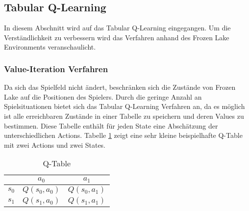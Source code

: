 \documentclass[11pt]{scrartcl}
\begin{document}
\subsection{Tabular Q-Learning}
In diesem Abschnitt wird auf das Tabular Q-Learning eingegangen. Um die
Ver\-ständ\-lich\-keit zu verbessern wird das Verfahren anhand des Frozen Lake
Environments veranschaulicht.


\subsubsection{Value-Iteration Verfahren}
Da sich das Spielfeld nicht ändert, beschränken sich die Zustände von Frozen Lake auf die
Positionen des Spielers. Durch die geringe Anzahl an Spielsituationen bietet sich das
Tabular Q-Learning Verfahren an, da es möglich ist alle erreichbaren Zustände in einer
Tabelle zu speichern und deren Values zu bestimmen. Diese Tabelle enthält für jeden State
eine Abschätzung der unterschiedlichen Actions. Tabelle \ref{tab:q_table} zeigt eine
sehr kleine beispielhafte Q-Table mit zwei Actions und zwei States.

\begin{table}[ht]
  \begin{center}
    \begin{tabular}{c | c | c}
       & $a_0$ & $a_1$ \\
      \hline
      $s_0$ & $Q(s_0, a_0)$ &$ Q(s_0, a_1)$ \\
      \hline
      $s_1$ & $Q(s_1, a_0)$ & $Q(s_1, a_1)$ \\
    \end{tabular}

    \caption[Q-Table]{Q-Table}
    \label{tab:q_table}
  \end{center}
\end{table}
\end{document}
